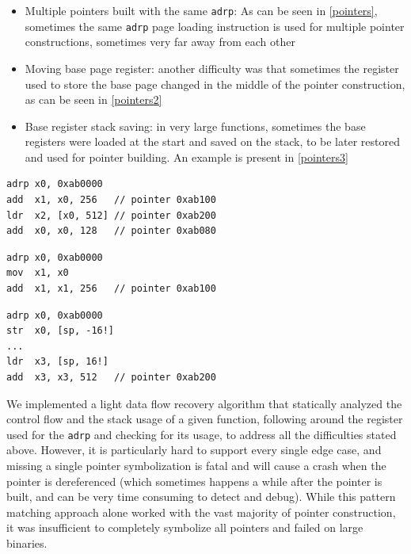 \documentclass[a4paper,11pt,oneside]{report}
\begin{document}
\begin{itemize}
	\item Multiple pointers built with the same \texttt{adrp}: As can be seen 
		in \autoref{pointers}, sometimes the same \texttt{adrp} page loading 
		instruction is used for multiple pointer constructions, sometimes very 
		far away from each other
	\item Moving base page register: another difficulty was that sometimes the 
		register used to store the base page changed in the middle of the 
		pointer construction, as can be seen in \autoref{pointers2}
	\item Base register stack saving: in very large functions, sometimes the 
		base registers were loaded at the start and saved on the stack, to be 
		later restored and used for pointer building. An example is present in 
		\autoref{pointers3}
\end{itemize}

\begin{lstlisting}[float,floatplacement=H,label=pointers,caption={Example of multiple pointers built from the same \texttt{adrp} instruction}]
adrp x0, 0xab0000
add  x1, x0, 256   // pointer 0xab100
ldr  x2, [x0, 512] // pointer 0xab200
add  x0, x0, 128   // pointer 0xab080
\end{lstlisting}
\begin{lstlisting}[float,floatplacement=H,label=pointers2,caption={Example of changing register during
pointer construction}]
adrp x0, 0xab0000
mov  x1, x0
add  x1, x1, 256   // pointer 0xab100
\end{lstlisting}
\begin{lstlisting}[float,floatplacement=H,label=pointers3,caption={Example of base page register stack
saving}]
adrp x0, 0xab0000
str  x0, [sp, -16!]
...
ldr  x3, [sp, 16!]
add  x3, x3, 512   // pointer 0xab200
\end{lstlisting}


We implemented a light data flow recovery algorithm
that statically analyzed the control flow and the stack usage of a given
function, following around the register used for the \texttt{adrp} and checking
for its usage, to address all the difficulties stated above. However, it is
particularly hard to support every single edge case, and missing a single
pointer symbolization is fatal and will cause a crash when the pointer is 
dereferenced (which sometimes happens a while after the pointer is built, 
and can be very time consuming to detect and debug). 
While this pattern matching approach alone worked with the vast majority of
pointer construction, it was insufficient to completely symbolize all pointers
and failed on large binaries. 
\end{document}
